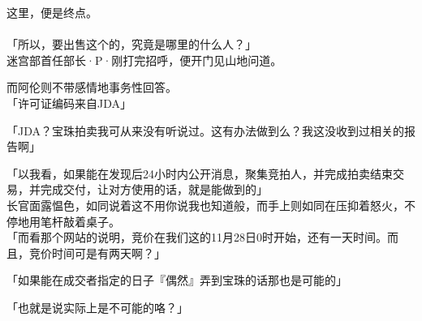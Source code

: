 这里，便是终点。\\

\sqsplit\\

「所以，要出售这个的，究竟是哪里的什么人？」\\

迷宫部首任部长·P·刚打完招呼，便开门见山地问道。

而阿伦则不带感情地事务性回答。\\

「许可证编码来自JDA」

「JDA？宝珠拍卖我可从来没有听说过。这有办法做到么？我这没收到过相关的报告啊」

「以我看，如果能在发现后24小时内公开消息，聚集竞拍人，并完成拍卖结束交易，并完成交付，让对方使用的话，就是能做到的」\\

长官面露愠色，如同说着这不用你说我也知道般，而手上则如同在压抑着怒火，不停地用笔杆敲着桌子。\\

「而看那个网站的说明，竞价在我们这的11月28日0时开始，还有一天时间。而且，竞价时间可是有两天啊？」

「如果能在成交者指定的日子『偶然』弄到宝珠的话那也是可能的」

「也就是说实际上是不可能的咯？」\\

